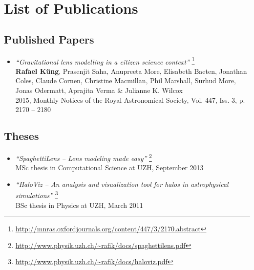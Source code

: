 \documentclass[12pt]{article}
\begin{document}
\pagestyle{empty}

\section*{List of Publications}

\subsection{Published Papers}

\begin{itemize}
\item
  \emph{``Gravitational lens modelling in a citizen science context''}
  \footnote{\url{http://mnras.oxfordjournals.org/content/447/3/2170.abstract}}\\
    {\footnotesize 
        {\bf Rafael Küng},
        Prasenjit Saha,
        Anupreeta More,
        Elisabeth Baeten,
        Jonathan Coles,
        Claude Cornen,
        Christine Macmillan,
        Phil Marshall,
        Surhud More,
        Jonas Odermatt,
        Aprajita Verma \&
        Julianne K. Wilcox\\    
		2015, Monthly Notices of the Royal Astronomical Society, Vol. 447, Iss. 3, p. 2170 -- 2180
  	}

\end{itemize}


%


\subsection{Theses}

\begin{itemize}
  \item
    \emph{``SpaghettiLens -- Lens modeling made easy''}
    \footnote{\url{http://www.physik.uzh.ch/~rafik/docs/spaghettilens.pdf}}\\
    {\footnotesize 
        MSc thesis in Computational Science at UZH, September 2013
    }
  \item
    \emph{``HaloViz --  An analysis and visualization tool for halos in astrophysical \\ simulations''}
    \footnote{\url{http://www.physik.uzh.ch/~rafik/docs/haloviz.pdf}}\\
    {\footnotesize 
        BSc thesis in Physics at UZH, March 2011
    }
\end{itemize}
\end{document}
